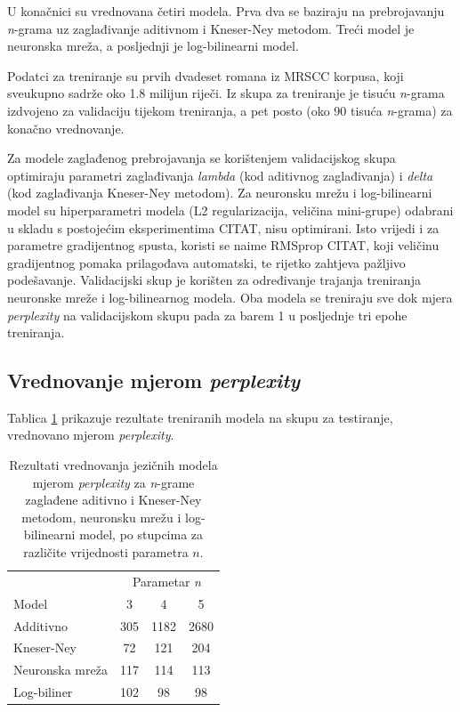 \documentclass[times, utf8, diplomski, numeric]{fer}
\begin{document}
U konačnici su vrednovana četiri modela. Prva dva se baziraju na prebrojavanju \textit{n}-grama uz zaglađivanje aditivnom i Kneser-Ney metodom. Treći model je neuronska mreža, a posljednji je log-bilinearni model.

Podatci za treniranje su prvih dvadeset romana iz MRSCC korpusa, koji sveukupno sadrže oko 1.8 milijun riječi. Iz skupa za treniranje je tisuću \textit{n}-grama izdvojeno za validaciju tijekom treniranja, a pet posto (oko 90 tisuća \textit{n}-grama) za konačno vrednovanje.

Za modele zaglađenog prebrojavanja se korištenjem validacijskog skupa optimiraju parametri zaglađivanja \textit{lambda} (kod aditivnog zaglađivanja) i \textit{delta} (kod zaglađivanja Kneser-Ney metodom). Za neuronsku mrežu i log-bilinearni model su hiperparametri modela (L2 regularizacija, veličina mini-grupe) odabrani u skladu s postojećim eksperimentima CITAT, nisu optimirani. Isto vrijedi i za parametre gradijentnog spusta, koristi se naime RMSprop CITAT, koji veličinu gradijentnog pomaka prilagođava automatski, te rijetko zahtjeva pažljivo podešavanje. Validacijski skup je korišten za određivanje trajanja treniranja neuronske mreže i log-bilinearnog modela. Oba modela se treniraju sve dok mjera \textit{perplexity} na validacijskom skupu pada za barem 1 u posljednje tri epohe treniranja.

\subsection{Vrednovanje mjerom \textit{perplexity}}

Tablica \ref{tbl:eval_perplexity} prikazuje rezultate treniranih modela na skupu za testiranje, vrednovano mjerom \textit{perplexity}.

\begin{table}[htb]
\caption{Rezultati vrednovanja jezičnih modela mjerom \textit{perplexity} za \textit{n}-grame zaglađene aditivno i Kneser-Ney metodom, neuronsku mrežu i log-bilinearni model, po stupcima za različite vrijednosti parametra $n$.}
\label{tbl:eval_perplexity}
\centering
\begin{tabular}{lccc}
\toprule
 & \multicolumn{3}{c}{Parametar \textit{n}} \\
\cmidrule(r){2-4}
Model & 3 & 4 & 5 \\
\midrule
Additivno &  305 & 1182 & 2680 \\
Kneser-Ney & 72 & 121 & 204 \\
Neuronska mreža & 117 & 114 & 113 \\
Log-biliner & 102 & 98 & 98 \\
\bottomrule
\end{tabular}
\end{table}
\end{document}
